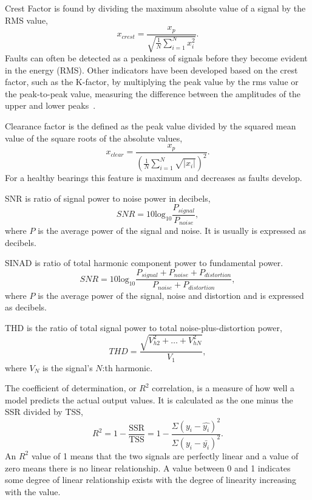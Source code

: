 \documentclass[]{article}
\begin{document}
Crest Factor is found by dividing the maximum absolute value of a signal by the \gls{RMS} value,
\begin{equation}
x_{crest} = \frac{x_p}{\sqrt{\frac{1}{N}\sum^N_{i=1}x^2_i}}.
\end{equation}
Faults can often be detected as a peakiness of signals before they become evident in the energy (\gls{RMS}). Other indicators have been developed based on the crest factor, such as the K-factor, by multiplying the peak value by the rms value or the peak-to-peak value, measuring the difference between the amplitudes of the upper and lower peaks~\cite{soualhi2021novel}.

Clearance factor is the defined as the peak value divided by the squared mean value of the square roots of the absolute values,
\begin{equation}
x_{clear} = \frac{x_p}{(\frac{1}{N}\sum^N_{i=1}\sqrt{|x_i|})^2}.
\end{equation}
For a healthy bearings this feature is maximum and decreases as faults develop.

\gls{SNR} is ratio of signal power to noise power in decibels,
\begin{equation}
	SNR = 10 \textrm{log}_{10} \frac{P_{signal}}{P_{noise}},
\end{equation}
where $P$ is the average power of the signal and noise. It is usually is expressed as decibels.

\gls{SINAD} is ratio of total harmonic component power to fundamental power.
\begin{equation}
	SNR = 10 \textrm{log}_{10} \frac{P_{signal} + P_{noise} + P_{distortion}}{P_{noise} + P_{distortion}}, 
\end{equation}
where $P$ is the average power of the signal, noise and distortion and is expressed as decibels.

\gls{THD} is the ratio of total signal power to total noise-plus-distortion power,
\begin{equation}
	THD = \frac{\sqrt{V^2_{h2} + \hdots + V^2_{hN}}}{V_1},
\end{equation}
where $V_N$ is the signal's $N$:th harmonic.

The coefficient of determination, or $R^{2}$ correlation, is a measure of how well a model predicts the actual output values. It is calculated as the one minus the \gls{SSR} divided by \gls{TSS},
\begin{equation}
R^{2} = 1 - \frac{\textrm{SSR}}{\textrm{TSS}} = 1 - \frac{\Sigma(y_i - \hat{y_i})^2}{\Sigma(y_i - \bar{y_i})^2}. 
\end{equation}
An $R^{2}$ value of 1 means that the two signals are perfectly linear and a value of zero means there is no linear relationship. A value between 0 and 1 indicates some degree of linear relationship exists with the degree of linearity increasing with the value.
\end{document}

